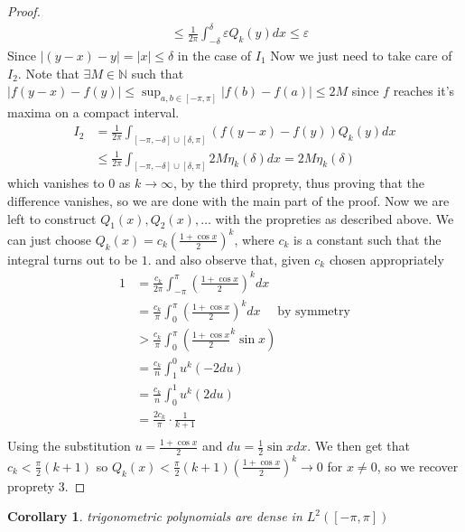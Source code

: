 \documentclass[13pt]{article}
\newtheorem{corollary}[theorem]{Corollary}
\theoremstyle{definition}
\theoremstyle{remark}
\begin{document}
\begin{proof}
\begin{align*}
        &\leq \frac{1}{2\pi} \int_{-\delta}^\delta \varepsilon Q_k(y)dx \leq \varepsilon 
    \end{align*}
    Since $|(y-x) - y| = |x| \leq \delta$ in the case of $I_1$
    Now we just need to take care of $I_2$. Note that $\exists M \in \mathbb{N}$ such that  $|f(y-x) - f(y)| \leq \sup_{a,b \in [-\pi,\pi]} |f(b) - f(a)| \leq 2M$ since $f$ reaches it's maxima on a compact interval. 
    \begin{align*}
        I_2 &= \frac{1}{2\pi} \int_{[-\pi,-\delta]\cup[\delta,\pi]} (f(y-x) - f(y))Q_k(y)dx \\
        &\leq \frac{1}{2\pi} \int_{[-\pi,-\delta]\cup[\delta,\pi]} 2M \eta_k(\delta)dx = 2M\eta_k(\delta)
    \end{align*}
    which vanishes to $0$ as $k \to \infty$, by the third proprety, thus proving that the difference vanishes, so we are done with the main part of the proof. 
    Now we are left to construct $Q_1(x), Q_2(x),\ldots$ with the propreties as described above. 
   We can just choose $ \displaystyle Q_k(x) = c_k \left(\frac{1 + \cos x}{2} \right)^k $, where $c_k$ is a constant such that the integral turns out to be $1$. 
   and also observe that, given $c_k$ chosen appropriately
   \begin{align*}
     1 &= \frac{c_k}{2\pi} \int_{-\pi}^\pi \left( \frac{1 + \cos x}{2}\right)^kdx \\
     &= \frac{c_k}{\pi} \int_{0}^\pi \left( \frac{1+ \cos x}{2}\right)^k dx \quad \text{ by symmetry} \\
     &> \frac{c_k}{\pi} \int_{0}^\pi \left( \frac{1 + \cos x}{2}^k \sin x\right) \\
     &= \frac{c_k}{n} \int_{1}^0 u^k (-2du)\\
     &=\frac{c_k}{n} \int_{0}^1 u^k (2du) \\
     &= \frac{2 c_k}{\pi} \cdot \frac{1}{k+1}\\
   \end{align*}
   Using the substitution $u = \frac{1+\cos x}{2}$ and $du = \frac{1}{2} \sin x dx$. 
   We then get that $c_k < \frac{\pi}{2} (k+1)$
   so $Q_k(x) < \frac{\pi}{2} (k+1) \left(\frac{1 + \cos x}{2}\right)^k \to 0$ for $x \neq 0$, so we recover proprety 3. 




\end{proof}
\begin{corollary}
    trigonometric polynomials are dense in $L^2([-\pi,\pi])$

   \end{corollary} 
    
\end{document}
